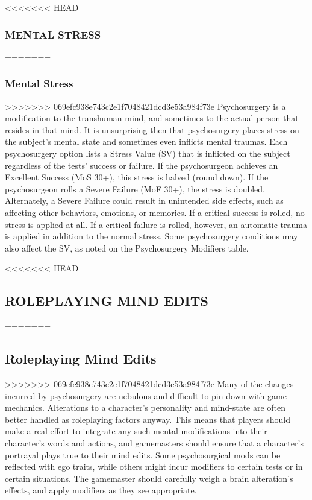 <<<<<<< HEAD \subsubsection{MENTAL STRESS} ======= \subsubsection{Mental Stress} >>>>>>> 069efc938e743c2e1f7048421dcd3e53a984f73e Psychosurgery is a modification to the transhuman mind, and sometimes to the actual person that resides in that mind. It is unsurprising then that psychosurgery places stress on the subject’s mental state and sometimes even inflicts mental traumas. Each psychosurgery option lists a Stress Value (SV) that is inflicted on the subject regardless of the tests’ success or failure. If the psychosurgeon achieves an Excellent Success (MoS 30+), this stress is halved (round down). If the psychosurgeon rolls a Severe Failure (MoF 30+), the stress is doubled. Alternately, a Severe Failure could result in unintended side effects, such as affecting other behaviors, emotions, or memories. If a critical success is rolled, no stress is applied at all. If a critical failure is rolled, however, an automatic trauma is applied in addition to the normal stress. Some psychosurgery conditions may also affect the SV, as noted on the Psychosurgery Modifiers table. 



<<<<<<< HEAD \subsection{ROLEPLAYING MIND EDITS} ======= \subsection{Roleplaying Mind Edits} >>>>>>> 069efc938e743c2e1f7048421dcd3e53a984f73e Many of the changes incurred by psychosurgery are nebulous and difficult to pin down with game mechanics. Alterations to a character’s personality and mind-state are often better handled as roleplaying factors anyway. This means that players should make a real effort to integrate any such mental modifications into their character’s words and actions, and gamemasters should ensure that a character’s portrayal plays true to their mind edits. Some psychosurgical mods can be reflected with ego traits, while others might incur modifiers to certain tests or in certain situations. The gamemaster should carefully weigh a brain alteration’s effects, and apply modifiers as they see appropriate. 



